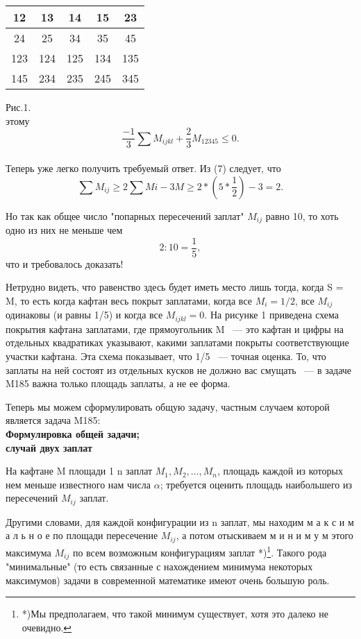 \documentclass[main.tex]{subfiles}
\begin{document}
\begin{multicols}{2}
\begin{center}
\begin{tabular}{|c|c|c|c|c|}
    \hline
    12 & 13 & 14 & 15 & 23\\
    \hline
    24 & 25 & 34 & 35 & 45\\
    \hline
    123 & 124 & 125 & 134 & 135\\
    \hline
    145 & 234 & 235 & 245 & 345\\
    \hline
\end{tabular}
\end{center}
Рис.1.\\
этому 
\[
\frac{-1}{3} \sum_{}{} M_{ijkl} + \frac{2}{3} M_{12345} \leq 0.
\]

Теперь уже легко получить требуемый ответ. Из (7) следует, что 
\[
\sum M_{ij} \geq 2  \sum M{i} - 3M \geq 2 * (5* \frac{1}{2}) - 3 = 2.
\]

Но так как общее число "попарных пересечений заплат" $M_{ij}$ равно 10, то хоть одно из них не меньше чем
\[
2:10 = \frac{1}{5},
\]
что и требовалось доказать!

Нетрудно видеть, что равенство здесь будет иметь место лишь тогда, когда S = M, то есть когда кафтан весь покрыт заплатами, когда все $M_i = 1/2$, все $M_{ij}$ одинаковы (и равны 1/5) и когда все $M_{ijkl} = 0$. На рисунке 1 приведена схема покрытия кафтана заплатами, где прямоугольник M ~--- это кафтан и цифры на отдельных квадратиках указывают, какими заплатами покрыты соответствующие участки кафтана. Эта схема показывает, что 1/5 ~--- точная оценка. То, что заплаты на ней состоят из отдельных кусков не должно вас смущать ~--- в задаче M185 важна только площадь заплаты, а не ее форма.

Теперь мы можем сформулировать общую задачу, частным случаем которой является задача M185:\\
\textbf{Формулировка общей задачи; \\случай двух заплат}

На кафтане M площади 1 n заплат $M_1, M_2, \dots, M_n$, площадь каждой из которых нем меньше известного нам числа $\alpha$; требуется оценить площадь наибольшего из пересечений $M_{ij}$ заплат.

Другими словами, для каждой конфигурации из n заплат, мы находим м а к с и м а л ь н о е по площади пересечение $M_{ij}$, а потом отыскиваем м и н и м у м этого максимума $M_{ij}$ по всем возможным конфигурациям заплат *)\footnote{*)Мы предполагаем, что такой минимум существует, хотя это далеко не очевидно.}. Такого рода "минимальные" (то есть связанные с нахождением минимума некоторых максимумов) задачи в современной математике имеют очень большую роль.


\end{multicols}
\end{document}
